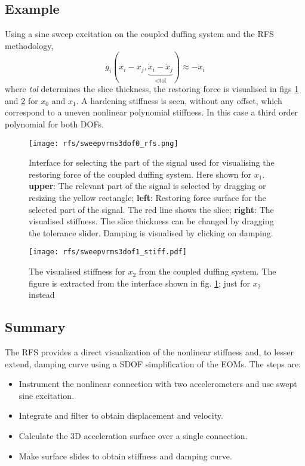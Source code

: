 \subsection{Example}
\label{sec:rfs_example}

Using a sine sweep excitation on the coupled duffing system and the RFS
methodology,
\begin{equation}
  \label{eq:rfs_tol}
  g_i (x_i - x_j , \underbrace{\dot x_i - \dot x_j}_\text{<tol}) \approx - \ddot x_i
\end{equation}
where \textit{tol} determines the slice thickness, the restoring force is
visualised in figs \ref{fig:rfs_full} and \ref{fig:rfs_stiff} for $x_0$ and
$x_1$. A hardening stiffness is seen, without any offset, which correspond to a
uneven nonlinear polynomial stiffness. In this case a third order polynomial for
both DOFs.

\begin{figure}[!ht]
  \centering
  \texttt{[image: rfs/sweepvrms3dof0\_rfs.png]}
  \caption{Interface for selecting the part of the signal used for
    visualising the restoring force of the coupled duffing system. Here shown
    for $x_1$.
    \textbf{upper}: The relevant part of the signal is selected by dragging or
    resizing the yellow rectangle;
    \textbf{left}: Restoring force surface for the selected part of the signal.
    The red line shows the slice;
    \textbf{right}: The visualised stiffness. The slice thickness can be changed
    by dragging the tolerance slider. Damping is visualised by clicking on
    damping.
  }
  \label{fig:rfs_full}
\end{figure}


\begin{figure}[!ht]
  \centering
  \texttt{[image: rfs/sweepvrms3dof1\_stiff.pdf]}
  \caption{The visualised stiffness for $x_2$ from the coupled duffing system.
    The figure is extracted from the interface shown in fig. \ref{fig:rfs_full};
    just for $x_2$ instead}
  \label{fig:rfs_stiff}
\end{figure}

\subsection{Summary}
\label{sec:rfs_summary}

The RFS provides a direct visualization of the nonlinear stiffness and, to
lesser extend, damping curve using a SDOF simplification of the EOMs. The steps
are:
\begin{itemize}
\item Instrument the nonlinear connection with two accelerometers and use swept
  sine excitation.
\item Integrate and filter to obtain displacement and velocity.
\item Calculate the 3D acceleration surface over a single connection.
\item Make surface slides to obtain stiffness and damping curve.
\end{itemize}

